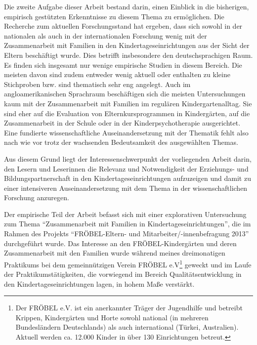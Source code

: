 \documentclass[12pt,a4paper]{article}
\begin{document}
Die zweite Aufgabe dieser Arbeit bestand darin, einen Einblick in die bisherigen, empirisch gestützten Erkenntnisse zu diesem Thema zu ermöglichen. Die Recherche zum aktuellen Forschungsstand hat ergeben, dass sich sowohl in der nationalen als auch in der internationalen Forschung wenig mit der Zusammenarbeit mit Familien in den Kindertageseinrichtungen aus der Sicht der Eltern beschäftigt wurde. Dies betrifft insbesondere den deutschsprachigen Raum.  Es finden sich insgesamt nur wenige empirische Studien in diesem Bereich. Die meisten davon sind zudem entweder wenig aktuell oder enthalten zu kleine Stichproben bzw. sind thematisch sehr eng angelegt. Auch im angloamerikanischen Sprachraum beschäftigen sich die meisten Untersuchungen kaum mit der Zusammenarbeit mit Familien im regulären Kindergartenalltag. Sie sind eher auf die Evaluation von Elternkursprogrammen in Kindergärten, auf die Zusammenarbeit in der Schule oder in der Kinderpsychotherapie ausgerichtet.  
Eine fundierte wissenschaftliche Auseinandersetzung mit der Thematik fehlt also nach wie vor trotz der wachsenden Bedeutsamkeit des ausgewählten Themas.

Aus diesem Grund liegt der Interessenschwerpunkt der vorliegenden Arbeit darin, den Lesern und Leserinnen die Relevanz und Notwendigkeit der Erziehungs- und Bildungspartnerschaft in den Kindertageseinrichtungen aufzuzeigen und damit zu einer intensiveren Auseinandersetzung mit dem Thema in der wissenschaftlichen Forschung anzuregen.
	
Der empirische Teil der Arbeit befasst sich mit einer explorativen Untersuchung zum Thema "`Zusammenarbeit mit Familien in Kindertageseinrichtungen"', die im Rahmen des Projekts "`FRÖBEL-Eltern- und Mitarbeiter/-innenbefragung 2013"' durchgeführt wurde. Das Interesse an den FRÖBEL-Kindergärten und deren Zusammenarbeit mit den Familien wurde während meines dreimonatigen Praktikums bei dem gemeinnützigen Verein FRÖBEL e.V\footnote{Der FRÖBEL e.V. ist ein anerkannter Träger der Jugendhilfe und betreibt Krippen, Kindergärten und Horte sowohl national (in mehreren Bundesländern Deutschlands) als auch international (Türkei, Australien). Aktuell werden ca. 12.000 Kinder in über 130 Einrichtungen betreut.} geweckt und im Laufe der Praktikumstätigkeiten, die vorwiegend im Bereich Qualitätsentwicklung in den Kindertageseinrichtungen lagen, in hohem Maße verstärkt.
\end{document}
